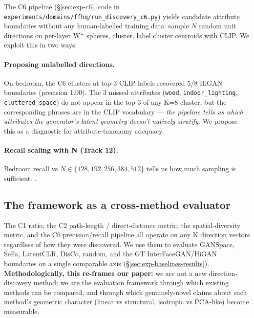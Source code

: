 The C6 pipeline (§\ref{sec:exp-c6}, code in
\texttt{experiments/domains/ffhq/run\_discovery\_c6.py}) yields
candidate attribute boundaries without any human-labelled training
data: sample $N$ random unit directions on per-layer W$^+$ spheres,
cluster, label cluster centroids with CLIP. We exploit this in two
ways:

\paragraph{Proposing unlabelled directions.}
On bedroom, the C6 clusters at top-3 CLIP labels recovered 5/8 HiGAN
boundaries (precision 1.00). The 3 missed attributes
(\texttt{wood}, \texttt{indoor\_lighting}, \texttt{cluttered\_space})
do not appear in the top-3 of any K=8 cluster, but the corresponding
phrases are in the CLIP vocabulary — \emph{the pipeline tells us
which attributes the generator's latent geometry doesn't natively
stratify}. We propose this as a diagnostic for attribute-taxonomy
adequacy.

\paragraph{Recall scaling with N (Track 12).}
Bedroom recall vs $N \in \{128, 192, 256, 384, 512\}$ tells us how
much sampling is sufficient. .

\subsection{The framework as a cross-method evaluator}
\label{sec:app-as-evaluator}

The C1 ratio, the C2 path-length / direct-distance metric, the
spatial-diversity metric, and the C6 precision/recall pipeline all
operate on any K direction vectors regardless of how they were
discovered. We use them to evaluate GANSpace, SeFa, LatentCLR,
DisCo, random, and the GT InterFaceGAN/HiGAN boundaries on a single
comparable axis (§\ref{sec:exp-baselines-results}).
\textbf{Methodologically, this re-frames our paper:} we are not a
new direction-discovery method; we are the evaluation framework
through which existing methods can be compared, and through which
genuinely-novel claims about each method's geometric character
(linear vs structural, isotropic vs PCA-like) become measurable.
